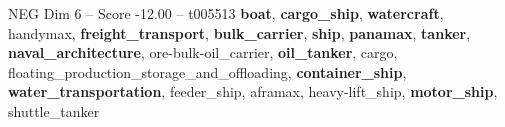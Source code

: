 \begin{textsample}{NEG Dim 6 – Score -12.00 – t005513}  \label{ex:f6_neg_009}
\textbf{boat}, \textbf{cargo\_ship}, \textbf{watercraft}, handymax, \textbf{freight\_transport}, \textbf{bulk\_carrier}, \textbf{ship}, \textbf{panamax}, \textbf{tanker}, \textbf{naval\_architecture}, ore-bulk-oil\_carrier, \textbf{oil\_tanker}, cargo, floating\_production\_storage\_and\_offloading, \textbf{container\_ship}, \textbf{water\_transportation}, feeder\_ship, aframax, heavy-lift\_ship, \textbf{motor\_ship}, shuttle\_tanker

\end{textsample}
